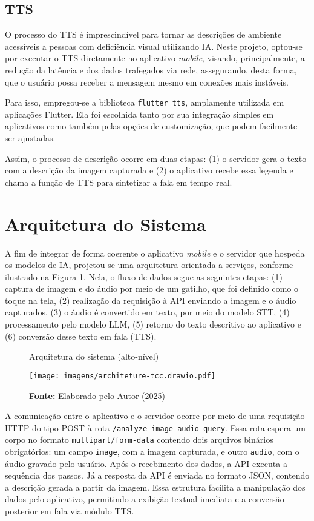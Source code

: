 \subsection{TTS}

O processo do TTS é imprescindível para tornar as descrições de ambiente acessíveis a pessoas com deficiência visual utilizando IA. Neste projeto, optou-se por executar o TTS diretamente no aplicativo \textit{mobile}, visando, principalmente, a redução da latência e dos dados trafegados via rede, assegurando, desta forma, que o usuário possa receber a mensagem mesmo em conexões mais instáveis.

Para isso, empregou-se a biblioteca \lstinline{flutter_tts}, amplamente utilizada em aplicações Flutter. Ela foi escolhida tanto por sua integração simples em aplicativos como também pelas opções de customização, que podem facilmente ser ajustadas. 

Assim, o processo de descrição ocorre em duas etapas: (1) o servidor gera o texto com a descrição da imagem capturada e (2) o aplicativo recebe essa legenda e chama a função de TTS para sintetizar a fala em tempo real.

\section{Arquitetura do Sistema}

A fim de integrar de forma coerente o aplicativo \textit{mobile} e o servidor que hospeda os modelos de IA, projetou-se uma arquitetura orientada a serviços, conforme ilustrado na Figura \ref{fig:6}. Nela, o fluxo de dados segue as seguintes etapas: (1) captura de imagem e do áudio por meio de um gatilho, que foi definido como o toque na tela, (2) realização da requisição à API enviando a imagem e o áudio capturados, (3) o áudio é convertido em texto, por meio do modelo STT, (4) processamento pelo modelo LLM, (5) retorno do texto descritivo ao aplicativo e (6) conversão desse texto em fala (TTS).

\begin{figure}[!h]
     \caption{Arquitetura do sistema (alto-nível)}
     \centering
     \texttt{[image: imagens/architeture-tcc.drawio.pdf]}
     \label{fig:6}
     \caption*{\textbf{Fonte:} Elaborado pelo Autor (2025)}
\end{figure}

A comunicação entre o aplicativo e o servidor ocorre por meio de uma requisição HTTP do tipo POST à rota \lstinline{/analyze-image-audio-query}. Essa rota espera um corpo no formato \lstinline{multipart/form-data} contendo dois arquivos binários obrigatórios: um campo \lstinline{image}, com a imagem capturada, e outro \lstinline{audio}, com o áudio gravado pelo usuário. Após o recebimento dos dados, a API executa a sequência dos passos. Já a resposta da API é enviada no formato JSON, contendo a descrição gerada a partir da imagem. Essa estrutura facilita a manipulação dos dados pelo aplicativo, permitindo a exibição textual imediata e a conversão posterior em fala via módulo TTS.

